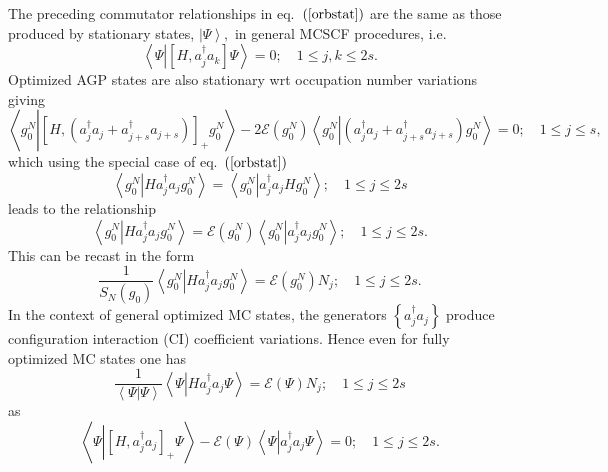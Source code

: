\documentclass[aps,preprint]{revtex4}%
\begin{document}
The preceding commutator relationships in eq.\ $\left(  \ref{orbstat}\right)
$ are the same as those produced by stationary states, $\left\vert
\Psi\right\rangle ,$ in general MCSCF procedures, i.e.\
\begin{equation}
\left\langle \Psi\left\vert \left[  H,a_{j}^{\dagger}a_{k}\right]
\Psi\right.  \right\rangle =0;\quad1\leq j,k\leq2s.
\end{equation}
Optimized AGP states are also stationary wrt occupation number variations
giving
\begin{equation}
\left\langle g_{0}^{N}\left\vert \left[  H,\left(  a_{j}^{\dagger}%
a_{j}+a_{j+s}^{\dagger}a_{j+s}\right)  \right]  _{+}g_{0}^{N}\right.
\right\rangle -2\mathcal{E}\left(  g_{0}^{N}\right)  \left\langle g_{0}%
^{N}\left\vert \left(  a_{j}^{\dagger}a_{j}+a_{j+s}^{\dagger}a_{j+s}\right)
g_{0}^{N}\right.  \right\rangle =0;\quad1\leq j\leq s,
\end{equation}
which using the special case of eq.\ $\left(  \ref{orbstat}\right)  $
\begin{equation}
\left\langle g_{0}^{N}\left\vert Ha_{j}^{\dagger}a_{j}g_{0}^{N}\right.
\right\rangle =\left\langle g_{0}^{N}\left\vert a_{j}^{\dagger}a_{j}Hg_{0}%
^{N}\right.  \right\rangle ;\quad1\leq j\leq2s
\end{equation}
leads to the relationship
\begin{equation}
\left\langle g_{0}^{N}\left\vert Ha_{j}^{\dagger}a_{j}g_{0}^{N}\right.
\right\rangle =\mathcal{E}\left(  g_{0}^{N}\right)  \left\langle g_{0}%
^{N}\left\vert a_{j}^{\dagger}a_{j}g_{0}^{N}\right.  \right\rangle ;\quad1\leq
j\leq2s.
\end{equation}
This can be recast in the form
\begin{equation}
\frac{1}{S_{N}\left(  g_{0}\right)  }\left\langle g_{0}^{N}\left\vert
Ha_{j}^{\dagger}a_{j}g_{0}^{N}\right.  \right\rangle =\mathcal{E}\left(
g_{0}^{N}\right)  N_{j};\quad1\leq j\leq2s. \label{occnumstat}%
\end{equation}
In the context of general optimized MC states, the generators $\left\{
a_{j}^{\dagger}a_{j}\right\}  $ produce configuration interaction (CI)
coefficient variations. Hence even for fully optimized MC states one has
\begin{equation}
\frac{1}{\left\langle \left.  \Psi\right\vert \Psi\right\rangle }\left\langle
\Psi\left\vert Ha_{j}^{\dagger}a_{j}\Psi\right.  \right\rangle =\mathcal{E}%
\left(  \Psi\right)  N_{j};\quad1\leq j\leq2s \label{MCocc}%
\end{equation}
as
\begin{equation}
\left\langle \Psi\left\vert \left[  H,a_{j}^{\dagger}a_{j}\right]  _{+}%
\Psi\right.  \right\rangle -\mathcal{E}\left(  \Psi\right)  \left\langle
\Psi\left\vert a_{j}^{\dagger}a_{j}\Psi\right.  \right\rangle =0;\quad1\leq
j\leq2s.
\end{equation}
\end{document}

